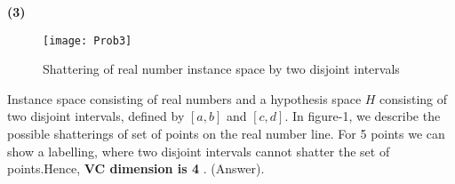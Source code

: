 \documentclass{article}
\renewcommand\part[1]{\vspace{.10in}\textbf{(#1)}}
\begin{document}
  \part{3}
  \begin{figure}[H]
   \centering
  \texttt{[image: Prob3]}
  \caption{Shattering of real number instance  space by two disjoint intervals}
  \end{figure}
  Instance space consisting of real numbers and a hypothesis space $H$ consisting of two disjoint intervals, defined by $[a,b]$ and $[c,d]$. \newline
  In figure-1, we describe the possible shatterings of set of points on the real number line. For 5 points we can show a labelling, where two disjoint intervals cannot shatter the set of points.Hence, \textbf {VC dimension is 4} . (Answer). \newline
\end{document}
